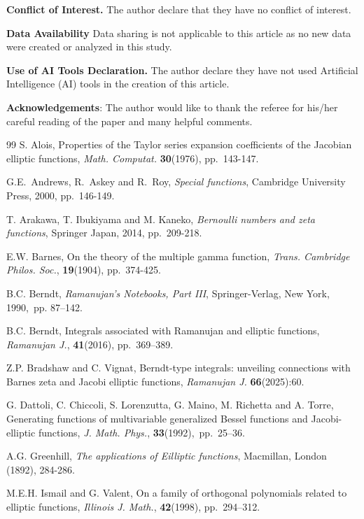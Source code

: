 \documentclass[11pt]{article}
\theoremstyle{plain}
\theoremstyle{definition}
\begin{document}
{\bf Conflict of Interest.} The author declare that they have no conflict of interest.

{\bf Data Availability} Data sharing is not applicable to this article as no new data were created or analyzed in this study.

{\bf Use of AI Tools Declaration.} The author declare they have not used Artificial Intelligence (AI) tools in the creation of this article.

{\bf Acknowledgements}: The author would like to thank the referee for his/her careful reading of the paper and many helpful comments.

\begin{thebibliography}{99}		
S. Alois, Properties of the Taylor series expansion coefficients of the Jacobian elliptic functions, \emph{Math. Computat.} \textbf{30}(1976), pp.\ 143-147.

G.E.\ Andrews, R.\ Askey and R.\ Roy, \emph{Special functions},
Cambridge University Press, 2000, pp.\ 146-149.

T. Arakawa, T. Ibukiyama and M. Kaneko, \emph{Bernoulli numbers and zeta functions}, Springer Japan, 2014, pp.\ 209-218.

E.W. Barnes, On the theory of the multiple gamma function, \emph{Trans. Cambridge Philos. Soc.}, \textbf{19}(1904), pp.\ 374-425.

 B.C. Berndt, \emph{Ramanujan's Notebooks, Part III}, Springer-Verlag, New York, 1990,\ pp. 87--142.
		
B.C. Berndt, Integrals associated with Ramanujan and elliptic functions, \emph{Ramanujan J.}, {\bf 41}(2016), pp.\  369--389.

Z.P. Bradshaw and C. Vignat, Berndt-type integrals: unveiling connections with Barnes zeta and Jacobi elliptic functions, \emph{Ramanujan J.} \textbf{66}(2025):60.

G. Dattoli, C. Chiccoli, S. Lorenzutta, G. Maino, M. Richetta and A. Torre, Generating
functions of multivariable generalized Bessel functions and Jacobi-elliptic functions, \emph{J.
Math. Phys.}, {\bf 33}(1992),\ pp.\ 25--36.

A.G. Greenhill, \emph{The applications of Eilliptic functions}, Macmillan, London (1892), 284-286.

M.E.H. Ismail and G. Valent, On a family of orthogonal polynomials related to elliptic functions, \emph{Illinois J. Math.}, \textbf{42}(1998), pp.\ 294--312.


\end{thebibliography}
\end{document}
